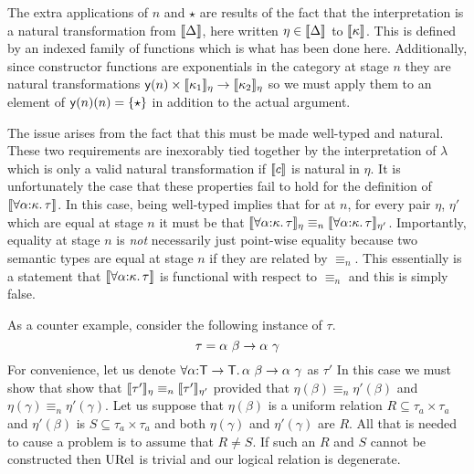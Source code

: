 The extra applications of $n$ and $\star$ are results of the fact that
the interpretation is a natural transformation from $\llbracket \Delta \rrbracket$,
here written $\eta \in \llbracket \Delta \rrbracket$ to $\llbracket \kappa \rrbracket$. This is
defined by an indexed family of functions which is what has been done
here. Additionally, since constructor functions are exponentials in
the category at stage $n$ they are natural transformations
$\mathsf{y}(n) \times \llbracket \kappa_1 \rrbracket_\eta \to \llbracket \kappa_2 \rrbracket_\eta$ so we
must apply them to an element of $\mathsf{y}(n)(n) = \{\star\}$ in
addition to the actual argument.

The issue arises from the fact that this must be made well-typed and
natural. These two requirements are inexorably tied together by the
interpretation of $\lambda$ which is only a valid natural
transformation if $\llbracket c \rrbracket$ is natural in $\eta$. It is unfortunately
the case that these properties fail to hold for the definition of
$\llbracket \forall \alpha {:} \kappa.\, \tau \rrbracket$. In this case, being well-typed
implies that for at $n$, for every pair $\eta$, $\eta'$ which are
equal at stage $n$ it must be that
$\llbracket \forall \alpha {:} \kappa.\, \tau \rrbracket_\eta \equiv_n \llbracket \forall \alpha {:} \kappa.\, \tau \rrbracket_{\eta'}$.
Importantly, equality at stage $n$ is \emph{not} necessarily just
point-wise equality because two semantic types are equal at stage $n$
if they are related by $\equiv_n$. This essentially is a statement
that $\llbracket \forall \alpha {:} \kappa.\, \tau \rrbracket$ is functional with respect to
$\equiv_n$ and this is simply false.

As a counter example, consider the following instance of $\tau$.
\[
  \tau = \alpha\ \beta \to \alpha\ \gamma
\]
For convenience, let us denote
$\forall \alpha {:} \mathsf{T} \to \mathsf{T}.\, \alpha\ \beta \to \alpha\ \gamma$
as $\tau'$ In this case we must show that show that
$\llbracket \tau' \rrbracket_\eta \equiv_n \llbracket \tau' \rrbracket_{\eta'}$ provided that
$\eta(\beta) \equiv_n \eta'(\beta)$ and
$\eta(\gamma) \equiv_n \eta'(\gamma)$. Let us suppose that
$\eta(\beta)$ is a uniform relation $R \subseteq \tau_a \times \tau_a$
and $\eta'(\beta)$ is $S \subseteq \tau_a \times \tau_a$ and both
$\eta(\gamma)$ and $\eta'(\gamma)$ are $R$. All that is needed to
cause a problem is to assume that $R \neq S$. If such an $R$ and $S$
cannot be constructed then $\mathrm{URel}$ is trivial and our logical relation
is degenerate.

